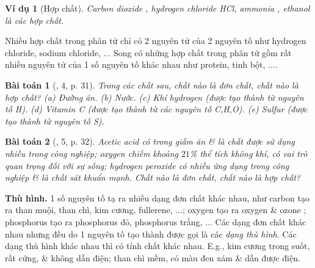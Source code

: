 \documentclass{article}
\newtheorem{baitoan}{Bài toán}
\newtheorem{vidu}{Ví dụ}
\begin{document}
\begin{vidu}[Hợp chất]
	Carbon dioxide , hydrogen chloride HCl, ammonia , ethanol  là các hợp chất.
\end{vidu}
Nhiều hợp chất trong phân tử chỉ có 2 nguyên tử của 2 nguyên tố như hydrogen chloride, sodium chloride, $\ldots$ Song có những hợp chất trong phân tử gồm rất nhiều nguyên tử của 1 số nguyên tố khác nhau như protein, tinh bột, $\ldots$.

\begin{baitoan}[\cite{SGK_KHTN_7_Canh_Dieu}, 4, p. 31]
	Trong các chất sau, chất nào là đơn chất, chất nào là hợp chất? (a) Đường ăn. (b) Nước. (c) Khí hydrogen (được tạo thành từ nguyên tố \emph{H}). (d) Vitamin C (được tạo thành từ các nguyên tố \emph{C,H,O}). (e) Sulfur (được tạo thành từ nguyên tố \emph{S}).
\end{baitoan}

\begin{baitoan}[\cite{SGK_KHTN_7_Canh_Dieu}, 5, p. 32]
	Acetic acid có trong giấm ăn \& là chất được sử dụng nhiều trong công nghiệp; oxygen chiếm khoảng $21$\% thể tích không khí, có vai trò quan trọng đối với sự sống; hydrogen peroxide có nhiều ứng dụng trong công nghiệp \& là chất sát khuẩn mạnh. Chất nào là đơn chất, chất nào là hợp chất?
\end{baitoan}
\textbf{Thù hình.} 1 số nguyên tố tạ ra nhiều dạng đơn chất khác nhau, như carbon tạo ra than muội, than chì, kim cương, fullerene, $\ldots$; oxygen tạo ra oxygen  \& ozone ; phosphorus tạo ra phosphorus đỏ, phosphorus trắng, $\ldots$ Các dạng đơn chất khác nhau nhưng đều do 1 nguyên tố tạo thành được gọi là các \textit{dạng thù hình}. Các dạng thù hình khác nhau thì có tính chất khác nhau. E.g., kim cương trong suốt, rất cứng, \& không dẫn điện; than chì mềm, có màu đen xám \& dẫn được điện.

\noindent{}

\end{document}
